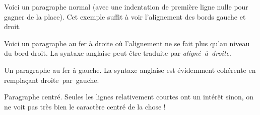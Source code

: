 \documentclass[12pt,a4paper,twoside]{article}
\begin{document}
Voici un paragraphe normal (avec une
indentation de première ligne nulle pour
gagner de la place). Cet exemple suffit
à voir l’alignement des bords gauche et
droit.

\begin{flushright}
Voici un paragraphe au fer à droite où
l’alignement ne se fait plus qu’au
niveau du bord droit. La syntaxe
anglaise peut être traduite par
\emph{aligné~à~droite}.
\end{flushright}\par %

\begin{flushleft}
Un paragraphe au fer à gauche. La syntaxe
anglaise est évidemment cohérente en
remplaçant droite~par~gauche.
\end{flushleft}

\begin{center}
Paragraphe centré. Seules les lignes
relativement courtes ont un intérêt sinon,
on ne voit pas très bien le caractère
centré de la chose !
\end{center}
\end{document}
